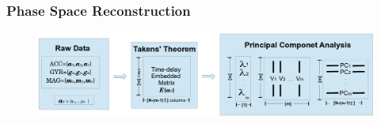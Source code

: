 \documentclass{beamer}
\begin{document}
\begin{frame}
\frametitle{Phase Space Reconstruction}

\begin{figure}
 \includegraphics[scale=.23]{diagram_v9} \\
\end{figure} 
 
\end{frame}


% 
%
\end{document}
